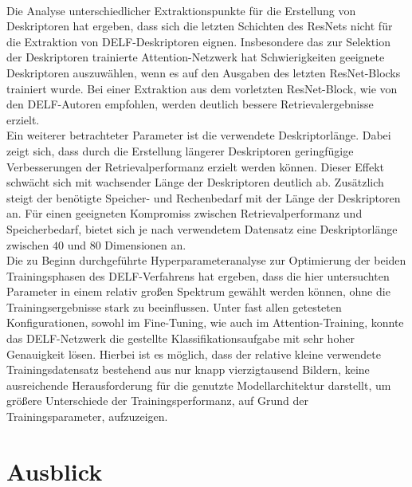 \\
Die Analyse unterschiedlicher Extraktionspunkte für die Erstellung von Deskriptoren hat ergeben, dass sich die letzten Schichten des ResNets nicht für die Extraktion von DELF-Deskriptoren eignen. Insbesondere das zur Selektion der Deskriptoren trainierte Attention-Netzwerk hat Schwierigkeiten geeignete Deskriptoren auszuwählen, wenn es auf den Ausgaben des letzten ResNet-Blocks trainiert wurde. Bei einer Extraktion aus dem vorletzten ResNet-Block, wie von den DELF-Autoren empfohlen, werden deutlich bessere Retrievalergebnisse erzielt.
\\
Ein weiterer betrachteter Parameter ist die verwendete Deskriptorlänge. Dabei zeigt sich, dass durch die Erstellung längerer Deskriptoren geringfügige Verbesserungen der Retrievalperformanz erzielt werden können. Dieser Effekt schwächt sich mit wachsender Länge der Deskriptoren deutlich ab. Zusätzlich steigt der benötigte Speicher- und Rechenbedarf mit der Länge der Deskriptoren an. Für einen geeigneten Kompromiss zwischen Retrievalperformanz und Speicherbedarf, bietet sich je nach verwendetem Datensatz eine Deskriptorlänge zwischen $40$ und $80$ Dimensionen an.
\\
Die zu Beginn durchgeführte Hyperparameteranalyse zur Optimierung der beiden Trainingsphasen des DELF-Verfahrens hat ergeben, dass die hier untersuchten Parameter in einem relativ großen Spektrum gewählt werden können, ohne die Trainingsergebnisse stark zu beeinflussen. Unter fast allen getesteten Konfigurationen, sowohl im Fine-Tuning, wie auch im Attention-Training, konnte das DELF-Netzwerk die gestellte Klassifikationsaufgabe mit sehr hoher Genauigkeit lösen. Hierbei ist es möglich, dass der relative kleine verwendete Trainingsdatensatz bestehend aus nur knapp vierzigtausend Bildern, keine ausreichende Herausforderung für die genutzte Modellarchitektur darstellt, um größere Unterschiede der Trainingsperformanz, auf Grund der Trainingsparameter, aufzuzeigen.

\section{Ausblick}
